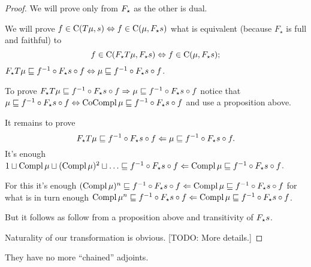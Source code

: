 \begin{proof}
  We will prove only from $F_{\star}$ as the other is dual.
  
  We will prove $f \in \mathrm{C} (T \mu, s) \Leftrightarrow f \in \mathrm{C}
  (\mu, F_{\star} s)$ what is equivalent
  (because $F_{\star}$ is full and faithful) to
  \[ f \in \mathrm{C} (F_{\star} T \mu, F_{\star} s) \Leftrightarrow f \in
     \mathrm{C} (\mu, F_{\star} s) ; \]
  $F_{\star} T \mu \sqsubseteq f^{- 1} \circ F_{\star} s \circ f
  \Leftrightarrow \mu \sqsubseteq f^{- 1} \circ F_{\star} s \circ f$.
  
  To prove $F_{\star} T \mu \sqsubseteq f^{- 1} \circ F_{\star} s \circ f
  \Rightarrow \mu \sqsubseteq f^{- 1} \circ F_{\star} s \circ f$
  notice that $\mu \sqsubseteq f^{- 1} \circ F_{\star} s \circ f
  \Leftrightarrow \operatorname{CoCompl}\mu \sqsubseteq f^{- 1} \circ F_{\star} s \circ f$
  and use a proposition above.
  
  It remains to prove
  \[ F_{\star} T \mu \sqsubseteq f^{- 1} \circ F_{\star} s \circ f \Leftarrow
     \mu \sqsubseteq f^{- 1} \circ F_{\star} s \circ f. \]
  It's enough $1 \sqcup \operatorname{Compl} \mu \sqcup (\operatorname{Compl} \mu)^2 \sqcup
  \ldots \sqsubseteq f^{- 1} \circ F_{\star} s \circ f \Leftarrow \operatorname{Compl}
  \mu \sqsubseteq f^{- 1} \circ F_{\star} s \circ f$.
  
  For this it's enough $(\operatorname{Compl} \mu)^n \sqsubseteq f^{- 1} \circ
  F_{\star} s \circ f \Leftarrow \operatorname{Compl} \mu \sqsubseteq f^{- 1} \circ
  F_{\star} s \circ f$ for what is in turn enough $\operatorname{Compl} \mu^n
  \sqsubseteq f^{- 1} \circ F_{\star} s \circ f \Leftarrow \operatorname{Compl} \mu
  \sqsubseteq f^{- 1} \circ F_{\star} s \circ f$.
  
  But it follows as follow from a proposition above and transitivity of
  $F_{\star} s$.
  
  Naturality of our transformation is obvious. [TODO: More details.]
\end{proof}

\begin{conjecture}
  They have no more ``chained'' adjoints.
\end{conjecture}
